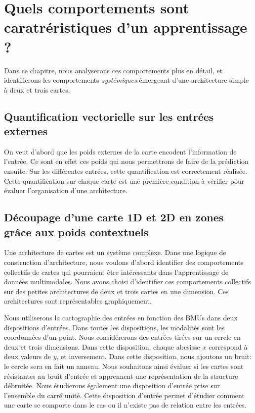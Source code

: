 \section{Quels comportements sont caratréristiques d'un apprentissage ?}
Dans ce chapitre, nous analyserons ces comportements plus en détail, et identifierons les comportements \emph{systémiques} émergeant d'une architecture simple à deux et trois cartes.
\subsection{Quantification vectorielle sur les entrées externes}

On veut d'abord que les poids externes de la carte encodent l'information de l'entrée. Ce sont en effet ces poids qui nous permettrons de faire de la prédiction ensuite.
Sur les différentes entrées, cette quantification est correctement réalisée. 
Cette quantification sur chaque carte est une première condition à vérifier pour évaluer l'organisation d'une architecture.

\subsection{Découpage d'une carte 1D et 2D en zones grâce aux poids contextuels}

Une architecture de cartes est un système complexe. 
Dans une logique de construction d'architecture, nous voulons d'abord identifier des comportements collectifs de cartes qui pourraient être intéressants dans l'apprentissage de données multimodales.
Nous avons choisi d'identifier ces comportements collectifs sur des petites architectures de deux et trois cartes en une dimension. Ces architectures sont représentables graphiquement.

Nous utiliserons la cartographie des entrées en fonction des BMUs dans deux dispositions d'entrées.
Dans toutes les dispositions, les modalités sont les coordonnées d'un point.
Nous considérerons des entrées tirées sur un cercle en deux et trois dimensions.
Dans cette disposition, chaque abcsisse $x$ correspond à deux valeurs de $y$, et inversement.
Dans cette disposition, nous ajoutons un bruit: le cercle sera en fait un anneau. Nous souhaitons ainsi évaluer si les cartes sont résistantes au bruit d'entrée et apprennent une représentation de la structure débruitée.
Nous étudierons également une disposition d'entrée prise sur l'ensemble du carré unité. Cette disposition d'entrée permet d'étudier comment une carte se comporte dans le cas ou il n'existe pas de relation entre les entrées.

